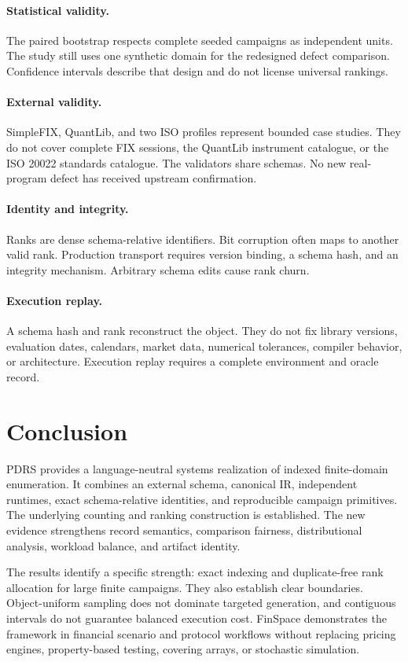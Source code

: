 \documentclass[10pt]{article}
\begin{document}
\paragraph{Statistical validity.}
The paired bootstrap respects complete seeded campaigns as independent units. The study still uses one synthetic domain for the redesigned defect comparison. Confidence intervals describe that design and do not license universal rankings.

\paragraph{External validity.}
SimpleFIX, QuantLib, and two ISO profiles represent bounded case studies. They do not cover complete FIX sessions, the QuantLib instrument catalogue, or the ISO 20022 standards catalogue. The validators share schemas. No new real-program defect has received upstream confirmation.

\paragraph{Identity and integrity.}
Ranks are dense schema-relative identifiers. Bit corruption often maps to another valid rank. Production transport requires version binding, a schema hash, and an integrity mechanism. Arbitrary schema edits cause rank churn.

\paragraph{Execution replay.}
A schema hash and rank reconstruct the object. They do not fix library versions, evaluation dates, calendars, market data, numerical tolerances, compiler behavior, or architecture. Execution replay requires a complete environment and oracle record.

\section{Conclusion}
PDRS provides a language-neutral systems realization of indexed finite-domain enumeration. It combines an external schema, canonical IR, independent runtimes, exact schema-relative identities, and reproducible campaign primitives. The underlying counting and ranking construction is established. The new evidence strengthens record semantics, comparison fairness, distributional analysis, workload balance, and artifact identity.

The results identify a specific strength: exact indexing and duplicate-free rank allocation for large finite campaigns. They also establish clear boundaries. Object-uniform sampling does not dominate targeted generation, and contiguous intervals do not guarantee balanced execution cost. FinSpace demonstrates the framework in financial scenario and protocol workflows without replacing pricing engines, property-based testing, covering arrays, or stochastic simulation.
\end{document}
